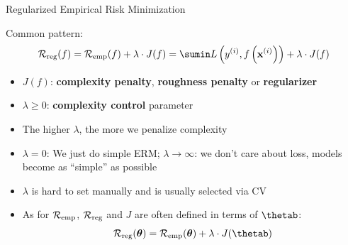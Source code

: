 \documentclass[11pt,compress,t,notes=noshow, xcolor=table]{beamer}
\begin{document}
\begin{vbframe}{Regularized Empirical Risk Minimization}

  Common pattern:
  $$
  \riskrf = \riskef + \lambda \cdot J(f) = \sumin \Lxyi + \lambda \cdot J(f)
  $$
\begin{itemize}


  \item $J(f)$: \textbf{complexity penalty}, \textbf{roughness penalty} or \textbf{regularizer}
  \item $\lambda \geq 0$: \textbf{complexity control} parameter
  \item The higher $\lambda$, the more we penalize complexity

  \item $\lambda = 0$: We just do simple ERM; $\lambda \to \infty$: we don't care about loss, models become as \enquote{simple} as possible

\item $\lambda$ is hard to set manually and is usually selected via CV

  \item As for $\mathcal{R}_{\text{emp}}$, $\mathcal{R}_{\text{reg}}$ and $J$ are often defined in terms of $\thetab$: \\
  
  $$\riskrt = \risket + \lambda \cdot J(\thetab)$$


\end{itemize}







\end{vbframe}



\endlecture
\end{document}
